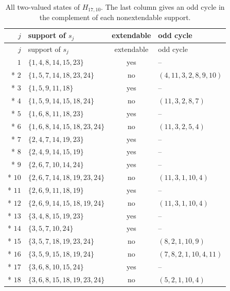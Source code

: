 \documentclass[aps,pra,reprint,superscriptaddress,longbibliography,nofootinbib,floatfix,10pt]{revtex4-2}
\theoremstyle{definition}
\begin{document}
\begingroup\small\setlength{\LTpre}{6pt}\setlength{\LTpost}{8pt}
\begin{longtable}{rlcl}
\caption{All two-valued states of $H_{17,10}$. The last column gives an odd cycle in the complement of each nonextendable support.}\label{tab:h17-states}\\
\toprule $j$ & support of $s_j$ & extendable & odd cycle\\\midrule
\endfirsthead
\toprule $j$ & support of $s_j$ & extendable & odd cycle\\\midrule
\endhead
\bottomrule\endfoot
$1$ & $\{1,4,8,14,15,23\}$ & yes & -- \\*
$2$ & $\{1,5,7,14,18,23,24\}$ & no & $(4,11,3,2,8,9,10)$ \\*
$3$ & $\{1,5,9,11,18\}$ & yes & -- \\*
$4$ & $\{1,5,9,14,15,18,24\}$ & no & $(11,3,2,8,7)$ \\*
$5$ & $\{1,6,8,11,18,23\}$ & yes & -- \\*
$6$ & $\{1,6,8,14,15,18,23,24\}$ & no & $(11,3,2,5,4)$ \\*
$7$ & $\{2,4,7,14,19,23\}$ & yes & -- \\*
$8$ & $\{2,4,9,14,15,19\}$ & yes & -- \\*
$9$ & $\{2,6,7,10,14,24\}$ & yes & -- \\*
$10$ & $\{2,6,7,14,18,19,23,24\}$ & no & $(11,3,1,10,4)$ \\*
$11$ & $\{2,6,9,11,18,19\}$ & yes & -- \\*
$12$ & $\{2,6,9,14,15,18,19,24\}$ & no & $(11,3,1,10,4)$ \\*
$13$ & $\{3,4,8,15,19,23\}$ & yes & -- \\*
$14$ & $\{3,5,7,10,24\}$ & yes & -- \\*
$15$ & $\{3,5,7,18,19,23,24\}$ & no & $(8,2,1,10,9)$ \\*
$16$ & $\{3,5,9,15,18,19,24\}$ & no & $(7,8,2,1,10,4,11)$ \\*
$17$ & $\{3,6,8,10,15,24\}$ & yes & -- \\*
$18$ & $\{3,6,8,15,18,19,23,24\}$ & no & $(5,2,1,10,4)$ \\
\end{longtable}\endgroup
\end{document}
